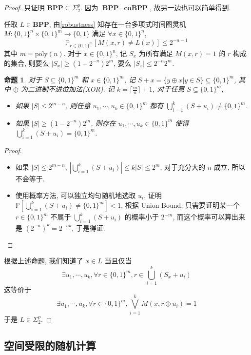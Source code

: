 \documentclass[8pt]{article}
\theoremstyle{compact}
\newtheorem{proposition}{命题}[section]
\def\le{\leqslant}
\def\ge{\geqslant}
\def\BPP{\textbf{BPP}}
\def\coBPP{\textbf{coBPP}}
\begin{document}
\begin{proof}
	只证明 $\BPP \subseteq \Sigma_2^p$. 因为 $\BPP = \coBPP$, 故另一边也可以简单得到.

	任取 $L \in \BPP$, 由\cref{robustness} 知存在一台多项式时间图灵机 $M: \{0, 1\}^n \times \{0, 1\}^{m} \to \{0, 1\}$ 满足 $\forall x \in \{0, 1\}^n$, $$\mathbb P_{r \in \{0, 1\}^{m}}[M(x, r) \neq L(x)] \le 2^{-n-1}$$ 其中 $m = \text{poly}(n)$. 对于 $x \in \{0, 1\}^n$, 记 $S_x$ 为所有满足 $M(x, r) = 1$ 的 $r$ 构成的集合, 则要么 $|S_x| \ge (1 - 2^{-n})2^m$, 要么 $|S_x| \le 2^{-n}2^m$.
	\begin{proposition}
		对于 $S \subseteq \{0, 1\}^m$ 和 $x \in \{0, 1\}^m$, 记 $S + x = \{y \oplus x | y \in S\} \subseteq \{0, 1\}^m$, 其中 $\oplus$ 为二进制不进位加法(XOR). 记 $k = \lceil \frac mn \rceil + 1$, 对于任意 $S \subseteq \{0, 1\}^m$, \begin{itemize}
			\item 如果 $|S| \le 2^{m-n}$, 则任意 $u_1, \cdots, u_k \in \{0, 1\}^m$ 都有 $\bigcup_{i=1}^k (S + u_i) \neq \{0, 1\}^m$.
		    \item 如果 $|S| \ge (1-2^{-n})2^m$, 则存在 $u_1, \cdots, u_k \in \{0, 1\}^m$ 使得 $\bigcup_{i=1}^k (S + u_i) = \{0, 1\}^m$.
		\end{itemize}
	\end{proposition}
	\begin{proof}
		\begin{itemize}
			\item 如果 $|S| \le 2^{m-n}$, $\left|\bigcup_{i=1}^k (S + u_i)\right| \le k|S| \le 2^m$, 对于充分大的 $n$ 成立, 所以不会等于.
		   \item 使用概率方法, 可以独立均匀随机地选取 $u_i$, 证明 $\mathbb P\left[\bigcup_{i=1}^k (S + u_i) \neq \{0, 1\}^m\right] < 1$. 根据 Union Bound, 只需要证明某一个 $r \in \{0, 1\}^m$ 不属于 $\bigcup_{i=1}^k (S + u_i)$ 的概率小于 $2^{-m}$, 而这个概率可以算出来是 $(2^{-n})^k = 2^{-nk}$, 于是得证.
		\end{itemize}
	\end{proof}

	根据上述命题, 我们知道了 $x \in L$ 当且仅当 $$\exists u_1, \cdots, u_k, \forall r \in \{0, 1\}^m, r \in \bigcup_{i=1}^k (S_x + u_i)$$ 这等价于 $$\exists u_1, \cdots, u_k, \forall r \in \{0, 1\}^m, \bigvee_{i=1}^k M(x, r \oplus u_i) = 1$$ 于是 $L \in \Sigma_2^p$.
\end{proof}

\subsection{空间受限的随机计算}
\def\BPL{\textbf{BPL}}
\def\RL{\textbf{RL}}
\end{document}
